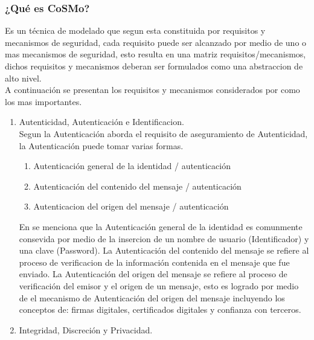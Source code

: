 \documentclass[runningheads,a4paper]{llncs}
\begin{document}
\subsubsection{¿Qué es \gls{CoSMo}?}
Es un técnica de modelado que segun \cite{CoSMoIntroduction} esta constituida por requisitos y mecanismos de seguridad, cada requisito puede ser alcanzado por medio de uno o mas mecanismos de seguridad, esto resulta en una matriz requisitos/mecanismos, dichos requisitos y mecanismos deberan ser formulados como una abstraccion de alto nivel.\\

A continuación se presentan los requisitos y mecanismos considerados por \cite{CoSMoIntroduction} como los mas importantes.

\begin{enumerate}
	\item Autenticidad, Autenticación e Identificacion.\\
	
	Segun \cite{CoSMoIntroduction} la Autenticación aborda el requisito de aseguramiento de Autenticidad, la Autenticación puede tomar varias formas.
	
	\begin{enumerate}
		\item Autenticación general de la identidad / autenticación
		\item Autenticación del contenido del mensaje  / autenticación
		\item Autenticacion del origen del mensaje / autenticación\\
	\end{enumerate}
	
En \cite{CoSMoIntroduction} se menciona que la Autenticación general de la identidad es comunmente consevida por medio de la insercion de un nombre de usuario (\gls{Identificador}) y una clave (\gls{Password}). La Autenticación del contenido del mensaje se refiere al proceso de verificacion de la información contenida en el mensaje que fue enviado. La Autenticación del origen del mensaje se refiere al proceso de verificación del emisor y el origen de un mensaje, esto es logrado por medio de el mecanismo de Autenticación del origen del mensaje incluyendo los conceptos de: firmas digitales, certificados digitales y confianza con terceros.\\

	\item Integridad, Discreción y Privacidad.\\
	

\end{enumerate}
\end{document}
